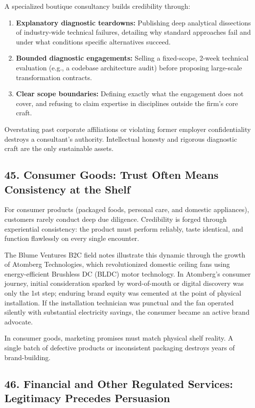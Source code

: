 A specialized boutique consultancy builds credibility through:
\begin{enumerate}
\item \textbf{Explanatory diagnostic teardowns:} Publishing deep analytical dissections of industry-wide technical failures, detailing why standard approaches fail and under what conditions specific alternatives succeed.
\item \textbf{Bounded diagnostic engagements:} Selling a fixed-scope, 2-week technical evaluation (e.g., a codebase architecture audit) before proposing large-scale transformation contracts.
\item \textbf{Clear scope boundaries:} Defining exactly what the engagement does not cover, and refusing to claim expertise in disciplines outside the firm's core craft.
\end{enumerate}

Overstating past corporate affiliations or violating former employer confidentiality destroys a consultant's authority. Intellectual honesty and rigorous diagnostic craft are the only sustainable assets.

\subsection*{45. Consumer Goods: Trust Often Means Consistency at the Shelf}

For consumer products (packaged foods, personal care, and domestic appliances), customers rarely conduct deep due diligence. Credibility is forged through experiential consistency: the product must perform reliably, taste identical, and function flawlessly on every single encounter.

The Blume Ventures B2C field notes illustrate this dynamic through the growth of Atomberg Technologies, which revolutionized domestic ceiling fans using energy-efficient Brushless DC (BLDC) motor technology. In Atomberg's consumer journey, initial consideration sparked by word-of-mouth or digital discovery was only the 1st step; enduring brand equity was cemented at the point of physical installation. If the installation technician was punctual and the fan operated silently with substantial electricity savings, the consumer became an active brand advocate.

In consumer goods, marketing promises must match physical shelf reality. A single batch of defective products or inconsistent packaging destroys years of brand-building.

\subsection*{46. Financial and Other Regulated Services: Legitimacy Precedes Persuasion}


